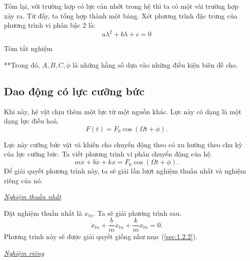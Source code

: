 \documentclass[12pt]{article}
\begin{document}
Tóm lại, với trường hợp có lực cản nhớt trong hệ thì ta có một vài trường hợp xảy ra. Từ đấy, ta tổng hợp thành một bảng. Xét phương trình đặc trưng của phương trình vi phân bậc 2 là:
\begin{equation*}
    a\lambda^2 + b\lambda + c = 0 
\end{equation*}

\begin{table}[!htb]
    \centering
    \caption{Tóm tắt nghiệm}
    
    \label{tab:1.7}
\end{table}

**Trong đó, \(A, B, C, \phi\) là những hằng số dựa vào những điều kiện biên đề cho.

\subsection{Dao động có lực cưỡng bức}
Khi này, hệ vật chịu thêm một lực từ một nguồn khác. Lực này có dạng là một dạng lực điều hoà.
\begin{equation}
    F(t) = F_0 \cos{\left(\Omega t + \phi \right)}.
    \label{eq:1.15}
\end{equation}

\begin{figure}[!htb]
    \centering
    
    \caption{}
    \label{fig:1.9}
\end{figure}

Lực này cưỡng bức vật và khiến cho chuyển động theo có xu hướng theo chu kỳ của lực cưỡng bức. Ta viết phương trình vi phân chuyển động của hệ.
\begin{equation}
    m \ddot{x} + b \dot{x} + k x  = F_0 \cos{\left(\Omega t + \phi \right)}.
    \label{eq:1.16}
\end{equation}
Để giải quyết phương trình này, ta sẽ giải lần lượt nghiệm thuần nhất và nghiệm riêng của nó.
\vspace{2mm}

\underline{\textit{Nghiệm thuần nhất}}

Đặt nghiệm thuần nhất là \(x_{tn}\). Ta sẽ giải phương trình sau.
\begin{equation}
    \ddot{x}_{tn} + {\displaystyle \frac{b}{m}} \dot{x}_{tn} + {\displaystyle \frac{k}{m}} x_{tn} = 0.
    \label{eq:1.17}
\end{equation}
Phương trình này sẽ được giải quyết giống như mục (\ref{sec:1.2.2}). 
\vspace{2mm}

\underline{\textit{Nghiệm riêng}}
\end{document}
